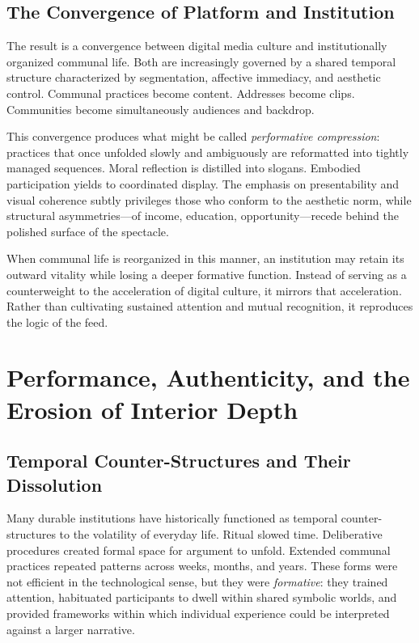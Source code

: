 \documentclass[11pt]{article}
\begin{document}
\subsection{The Convergence of Platform and Institution}

The result is a convergence between digital media culture and institutionally organized communal life. Both are increasingly governed by a shared temporal structure characterized by segmentation, affective immediacy, and aesthetic control. Communal practices become content. Addresses become clips. Communities become simultaneously audiences and backdrop.

This convergence produces what might be called \emph{performative compression}: practices that once unfolded slowly and ambiguously are reformatted into tightly managed sequences. Moral reflection is distilled into slogans. Embodied participation yields to coordinated display. The emphasis on presentability and visual coherence subtly privileges those who conform to the aesthetic norm, while structural asymmetries---of income, education, opportunity---recede behind the polished surface of the spectacle.

When communal life is reorganized in this manner, an institution may retain its outward vitality while losing a deeper formative function. Instead of serving as a counterweight to the acceleration of digital culture, it mirrors that acceleration. Rather than cultivating sustained attention and mutual recognition, it reproduces the logic of the feed.

\section{Performance, Authenticity, and the Erosion of Interior Depth}
\label{sec:belief}

\subsection{Temporal Counter-Structures and Their Dissolution}

Many durable institutions have historically functioned as temporal counter-structures to the volatility of everyday life. Ritual slowed time. Deliberative procedures created formal space for argument to unfold. Extended communal practices repeated patterns across weeks, months, and years. These forms were not efficient in the technological sense, but they were \emph{formative}: they trained attention, habituated participants to dwell within shared symbolic worlds, and provided frameworks within which individual experience could be interpreted against a larger narrative.
\end{document}
